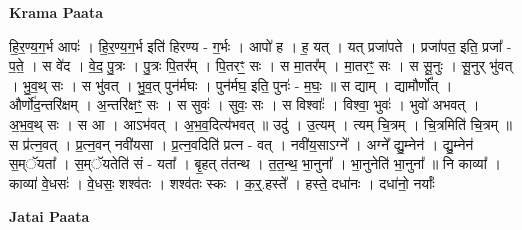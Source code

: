 \documentclass[17pt]{extarticle}
\begin{document}
\textbf{Krama Paata} \newline

हि॒र॒ण्य॒ग॒र्भ आपः॑ । हि॒र॒ण्य॒ग॒र्भ इति॑ हिरण्य - ग॒र्भः । आपो॑ ह । ह॒ यत् । यत् प्रजा॑पते । प्रजा॑पत॒ इति॒ प्रजा᳚ - प॒ते॒ । स वे॑द । वे॒द॒ पु॒त्रः । पु॒त्रः पि॒तर᳚म् । पि॒तरꣳ॒॒ सः । स मा॒तर᳚म् । मा॒तरꣳ॒॒ सः । स सू॒नुः । सू॒नुर् भु॑वत् । भु॒व॒थ् सः । स भु॑वत् । भु॒व॒त् पुन॑र्मघः । पुन॑र्मघ॒ इति॒ पुनः॑ - म॒घः॒ ॥ स द्याम् । द्यामौर्णो᳚त् । और्णो॑द॒न्तरि॑क्षम् । अ॒न्तरि॑क्षꣳ॒॒ सः । स सुवः॑ । सुवः॒ सः । स विश्वाः᳚ । विश्वा॒ भुवः॑ । भुवो॑ अभवत् । अ॒भ॒व॒थ् सः । स आ । आऽभ॑वत् । अ॒भ॒व॒दित्य॑भवत् ॥ उदु॑ । उ॒त्यम् । त्यम् चि॒त्रम् । चि॒त्रमिति॑ चि॒त्रम् ॥ स प्र॑त्न॒वत् । प्र॒त्न॒वन् नवी॑यसा । प्र॒त्न॒वदिति॑ प्रत्न - वत् । नवी॑य॒साऽग्ने᳚ । अग्ने᳚ द्यु॒म्नेन॑ । द्यु॒म्नेन॑ स॒म्ॅयता᳚ । स॒म्ॅयतेति॑ सं - यता᳚ । बृ॒हत् त॑तन्थ । त॒त॒न्थ॒ भा॒नुना᳚ । भा॒नुनेति॑ भा॒नुना᳚ ॥ नि काव्या᳚ । काव्या॑ वे॒धसः॑ । वे॒धसः॒ शश्व॑तः । शश्व॑तः स्कः । क॒र्॒.हस्ते᳚ । हस्ते॒ दधा॑नः । दधा॑नो॒ नर्याः᳚ \newline

\textbf{Jatai Paata} \newline
\end{document}
